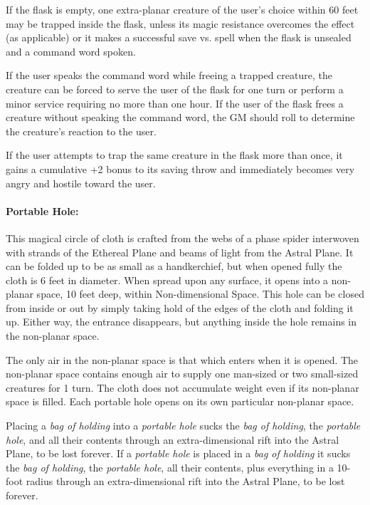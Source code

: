 \begin{multicols}{2}
If the flask is empty, one extra-planar creature of the user's choice within 60 feet may be trapped inside the flask, unless its magic resistance overcomes the effect (as applicable) or it makes a successful save vs. spell when the flask is unsealed and a command word spoken.  

If the user speaks the command word while freeing a trapped creature, the creature can be forced to serve the user of the flask for one turn or perform a minor service requiring no more than one hour.  If the user of the flask frees a creature without speaking the command word, the GM should roll to determine the creature's reaction to the user.  

If the user attempts to trap the same creature in the flask more than once, it gains a cumulative +2 bonus to its saving throw and immediately becomes very angry and hostile toward the user.

\paragraph{Portable Hole:} This magical circle of cloth is crafted from the webs of a phase spider interwoven with strands of the Ethereal Plane and beams of light from the Astral Plane.  It can be folded up to be as small as a handkerchief, but when opened fully the cloth is 6 feet in diameter.  When spread upon any surface, it opens into a non-planar space, 10 feet deep, within Non-dimensional Space.  This hole can be closed from inside or out by simply taking hold of the edges of the cloth and folding it up.  Either way, the entrance disappears, but anything inside the hole remains in the non-planar space. 

The only air in the non-planar space is that which enters when it is opened.  The non-planar space contains enough air to supply one man-sized or two small-sized creatures for 1 turn.  The cloth does not accumulate weight even if its non-planar space is filled.  Each portable hole opens on its own particular non-planar space.  

Placing a \textit{bag of holding} into a \textit{portable hole} sucks the \textit{bag of holding}, the \textit{portable hole}, and all their contents through an extra-dimensional rift into the Astral Plane, to be lost forever.  If a \textit{portable hole} is placed in a \textit{bag of holding} it sucks the \textit{bag of holding}, the \textit{portable hole}, all their contents, plus everything in a 10-foot radius through an extra-dimensional rift into the Astral Plane, to be lost forever.


\end{multicols}
